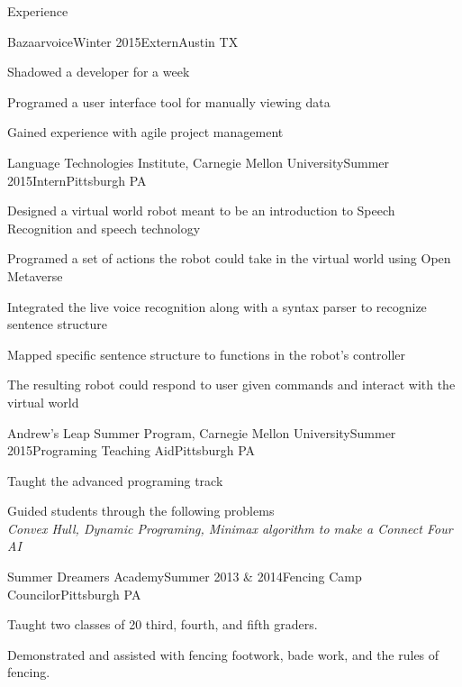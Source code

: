 \documentclass[12pt]{resume} %
\begin{document}
\begin{rSection}{Experience}

\begin{rSubsection}{Bazaarvoice}{Winter 2015}{Extern}{Austin TX}
        \item Shadowed a developer for a week
        \item Programed a user interface tool for manually viewing data
        \item Gained experience with agile project management
\end{rSubsection}


\begin{rSubsection}{Language Technologies Institute, Carnegie Mellon
    University}{Summer 2015}{Intern}{Pittsburgh PA}
        \item Designed a virtual world robot meant to be an introduction to Speech
            Recognition and speech technology
        \item Programed a set of actions the robot could take in the
            virtual world using Open Metaverse
        \item Integrated the live voice recognition along with a syntax
    parser to recognize sentence structure
        \item Mapped specific sentence structure to functions in the
    robot's controller
        \item The resulting robot could respond to user given commands
    and interact with the virtual world
\end{rSubsection}


\begin{rSubsection}{Andrew's Leap Summer Program, Carnegie Mellon
    University}{Summer 2015}{Programing Teaching Aid}{Pittsburgh PA}
        \item Taught the advanced programing track
        \item Guided students through the following problems\\
                {\em Convex Hull, Dynamic Programing, Minimax algorithm to make a Connect Four AI }
\end{rSubsection}

\begin{rSubsection}{Summer Dreamers Academy}{Summer 2013 \&
2014}{Fencing Camp Councilor}{Pittsburgh PA}
        \item Taught two classes of 20 third, fourth, and fifth graders.
        \item Demonstrated and assisted with fencing footwork, bade work, and the rules of fencing.
\end{rSubsection}

\end{rSection}
\end{document}
